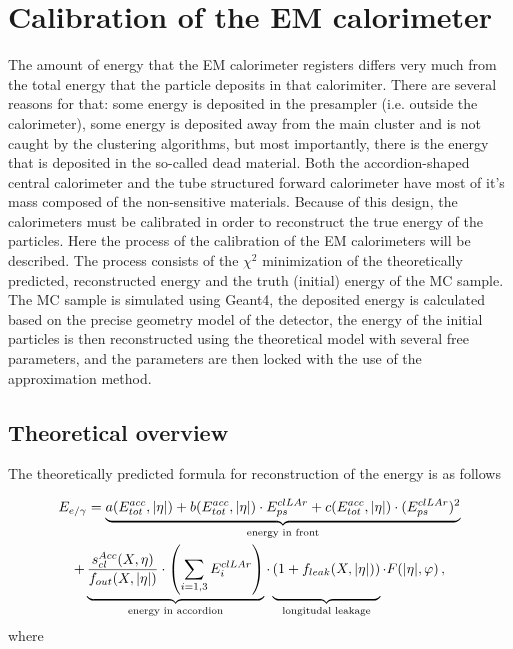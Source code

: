 \chapter{Calibration of the EM calorimeter}
\label{sec:Calibration}

The amount of energy that the EM calorimeter registers differs very much from the total energy that the particle deposits in that calorimiter. There are several reasons for that: some energy is deposited in the presampler (i.e. outside the calorimeter), some energy is deposited away from the main cluster and is not caught by the clustering algorithms, but most importantly, there is the energy that is deposited in the so-called dead material. Both the accordion-shaped central calorimeter and the tube structured forward calorimeter have most of it's mass composed of the non-sensitive materials. Because of this design, the calorimeters must be calibrated in order to reconstruct the  true energy of the particles. Here the process of the calibration of the EM calorimeters will be described. The process consists of the $\chi^{2}$ minimization of the theoretically predicted, reconstructed energy and the truth (initial) energy of the MC sample. The MC sample is simulated using Geant4, the deposited energy is calculated based on the precise geometry model of the detector, the energy of the initial particles is then reconstructed using the theoretical model with several free parameters, and the parameters are then locked with the use of the approximation method.

\section{Theoretical overview}

The theoretically predicted formula for reconstruction of the energy is as follows

\begin{equation}
\label{eq:calib_theory}
\begin{gathered}
E_{e/\gamma} = \underbrace{a(E^{acc}_{tot}, |\eta|) + b (E^{acc}_{tot}, |\eta|) \cdot E^{clLAr}_{ps} + c (E^{acc}_{tot}, |\eta|) \cdot (E^{clLAr}_{ps})^{2}}_\text{energy in front} \\
+ \underbrace{\frac{s^{Acc}_{cl}(X,\eta)}{f_{out}(X,|\eta|)} \cdot \left( \sum\limits_{i=1,3} E^{clLAr}_{i} \right)}_\text{energy in accordion}
 \cdot \underbrace{(1+f_{leak}(X,|\eta|)) \vphantom{\left( \sum\limits_{i=1,3} E^{clLAr}_{i} \right)}}_\text{longitudal leakage}
 \cdot F(|\eta|,\varphi) \,,
\end{gathered}
\end{equation}
where

